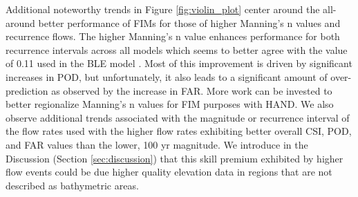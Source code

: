 \documentclass[draft]{dependencies/agujournal2019}
\begin{document}
Additional noteworthy trends in Figure \ref{fig:violin_plot} center around the all-around better performance of FIMs for those of higher Manning's n values and recurrence flows.
The higher Manning's n value enhances performance for both recurrence intervals across all models which seems to better agree with the value of 0.11 used in the BLE model \cite{fema2021base,fema2021estimated}.
Most of this improvement is driven by significant increases in POD, but unfortunately, it also leads to a significant amount of over-prediction as observed by the increase in FAR.
More work can be invested to better regionalize Manning's n values for FIM purposes with HAND.
We also observe additional trends associated with the magnitude or recurrence interval of the flow rates used with the higher flow rates exhibiting better overall CSI, POD, and FAR values than the lower, 100 yr magnitude.
We introduce in the Discussion (Section \ref{sec:discussion}) that this skill premium exhibited by higher flow events could be due higher quality elevation data in regions that are not described as bathymetric areas.
%
\end{document}
